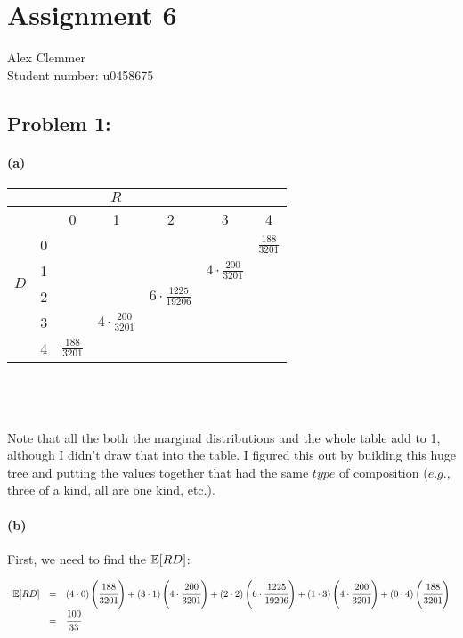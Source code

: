 \documentclass[a4paper]{article}
\begin{document}
\section*{Assignment 6}
Alex Clemmer\\
Student number: u0458675

\subsection*{Problem 1:} 

\paragraph{(a)} 

\renewcommand\arraystretch{1.5}
\begin{tabular}{ c | c | c | c | c | c | c }
& \multicolumn{4}{c}{$R$} \\
\hline
\multirow{7}{*}{$D$} & & 0 & 1 & 2 & 3 & 4 \\
\cline{2-7}
& 0 & & & & & $\frac{188}{3201}$ \\
\cline{2-7}
& 1 & & & & $4 \cdot \frac{200}{3201}$ & \\
\cline{2-7}
& 2 & & & $6 \cdot \frac{1225}{19206}$ & & \\
\cline{2-7}
& 3 & & $4 \cdot \frac{200}{3201}$ & & & \\
\cline{2-7}
& 4 & $\frac{188}{3201}$ & & & & \\
\end{tabular}
 \\\\\\
Note that all the both the marginal distributions and the whole table add to 1, although I didn't draw that into the table. I figured this out by building this huge tree and putting the values together that had the same $\textit{type}$ of composition ($\textit{e.g.}$, three of a kind, all are one kind, etc.).

\paragraph{(b)}

First, we need to find the $\mathbb{E}[RD]$:

\begin{equation}
\begin{array}{rll}
\mathbb{E}[RD] & = & (4 \cdot 0) \left( \cfrac{188}{3201} \right) + (3 \cdot 1) \left(4 \cdot \cfrac{200}{3201} \right) + (2 \cdot 2) \left(6 \cdot \cfrac{1225}{19206} \right) + (1 \cdot 3) \left(4 \cdot \cfrac{200}{3201} \right) + (0 \cdot 4) \left( \cfrac{188}{3201} \right) \\[.05in]
& = & \cfrac{100}{33} \\[.05in]
\end{array}
\end{equation}
\end{document}
